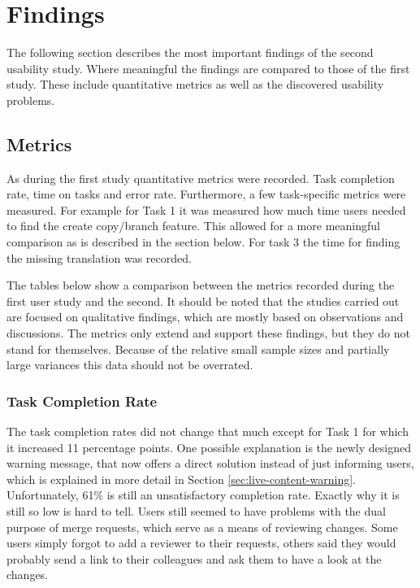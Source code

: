 \clearpage

\section{Findings}
The following section describes the most important findings of the second usability study. Where meaningful the findings are compared to those of the first study. These include quantitative metrics as well as the discovered usability problems.

\subsection{Metrics}
As during the first study quantitative metrics were recorded. Task completion rate, time on tasks and error rate. Furthermore, a few task-specific metrics were measured. For example for Task 1 it was measured how much time users needed to find the create copy/branch feature. This allowed for a more meaningful comparison as is described in the section below. For task 3 the time for finding the missing translation was recorded.

The tables below show a comparison between the metrics recorded during the first user study and the second. It should be noted that the studies carried out are focused on qualitative findings, which are mostly based on observations and discussions. The metrics only extend and support these findings, but they do not stand for themselves. Because of the relative small sample sizes and partially large variances this data should not be overrated.

\subsubsection{Task Completion Rate}
The task completion rates did not change that much except for Task 1 for which it increased 11 percentage points. One possible explanation is the newly designed warning message, that now offers a direct solution instead of just informing users, which is explained in more detail in Section \ref{sec:live-content-warning}. Unfortunately, 61\% is still an unsatisfactory completion rate. Exactly why it is still so low is hard to tell. Users still seemed to have problems with the dual purpose of merge requests, which serve as a means of reviewing changes. Some users simply forgot to add a reviewer to their requests, others said they would probably send a link to their colleagues and ask them to have a look at the changes.

